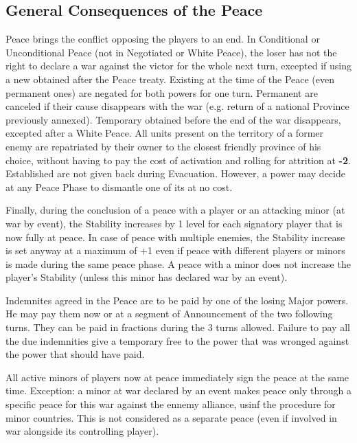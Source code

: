 \subsection{General Consequences of the Peace}

\aparag Peace brings the conflict opposing the players to an end.
\aparag In Conditional or Unconditional Peace (not in Negotiated or White
Peace), the loser has not the right to declare a war against the victor for
the whole next turn, excepted if using a new \CB obtained after the Peace
treaty.  Existing \CB at the time of the Peace (even permanent ones) are
negated for both powers for one turn.
Permanent \CB are canceled if their cause disappears with the war (e.g.
return of a national Province previously annexed). Temporary \CB obtained
before the end of the war disappears, excepted after a White Peace.
All units present on the territory of a former enemy are repatriated by their
owner to the closest friendly province of his choice, without having to pay
the cost of activation and rolling for attrition at {\bf -2}.
\bparag Established \Presidios are not given back during Evacuation.
\bparag However, a power may decide at any Peace Phase to dismantle one of its
\Presidios at no cost.

Finally, during the conclusion of a peace with a player or an attacking minor
(at war by event), the Stability increases by 1 level for each signatory
player that is now fully at peace.
\bparag In case of peace with multiple enemies, the Stability increase is set
anyway at a maximum of +1 even if peace with different players or minors is
made during the same peace phase.
\bparag A peace with a minor does not increase the player's Stability (unless
this minor has declared war by an event).

\aparag[Indemnities] Indemnites agreed in the Peace are to be paid by one of
the losing Major powers. He may pay them now or at a segment of Announcement
of the two following turns. They can be paid in fractions during the 3 turns
allowed.
\bparag Failure to pay all the due indemnities give a temporary free \CB to
the power that was wronged against the power that should have paid.

All active minors of players now at peace immediately sign the peace at the
same time.
\bparag
Exception: a minor at war declared by an event makes peace only through a
specific peace for this war against the ennemy alliance, usinf the procedure
for minor countries.  This is not considered as a separate peace (even if
involved in war alongside its controlling player).



